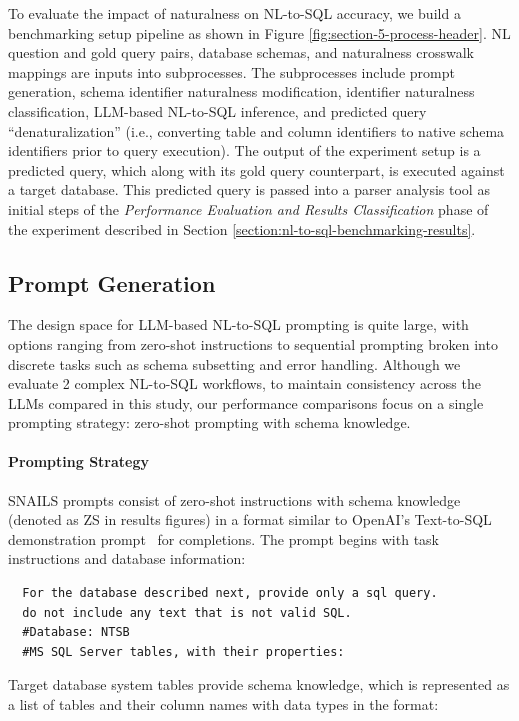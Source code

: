 To evaluate the impact of naturalness on NL-to-SQL accuracy, we build a benchmarking setup pipeline as shown in Figure \ref{fig:section-5-process-header}. 
NL question and gold query pairs, database schemas, and naturalness crosswalk mappings are inputs into subprocesses.
The subprocesses include prompt generation, schema identifier naturalness modification, identifier naturalness classification, LLM-based NL-to-SQL inference, and predicted query ``denaturalization'' (i.e., converting table and column identifiers to native schema identifiers prior to query execution).
The output of the experiment setup is a predicted query, which along with its gold query counterpart, is executed against a target database. 
This predicted query is passed into a parser analysis tool as initial steps of the \emph{Performance Evaluation and Results Classification} phase of the experiment described in Section \ref{section:nl-to-sql-benchmarking-results}.

\subsection{Prompt Generation}
The design space for LLM-based NL-to-SQL prompting is quite large, with options ranging from zero-shot instructions to sequential prompting broken into discrete tasks such as schema subsetting and error handling.
Although we evaluate 2 complex NL-to-SQL workflows, to maintain consistency across the LLMs compared in this study, our performance comparisons focus on a single prompting strategy: zero-shot prompting with schema knowledge.

\paragraph{\textbf{Prompting Strategy}}

SNAILS prompts consist of zero-shot  instructions with schema knowledge (denoted as ZS in results figures) in a format similar to OpenAI's Text-to-SQL demonstration prompt~\cite{gao2023texttosql} for completions. 
The prompt begins with task instructions and database information:

\begin{verbatim}
  For the database described next, provide only a sql query. 
  do not include any text that is not valid SQL.
  #Database: NTSB
  #MS SQL Server tables, with their properties:
\end{verbatim}

Target database system tables provide schema knowledge, which is represented as a list of tables and their column names with data types in the format:

